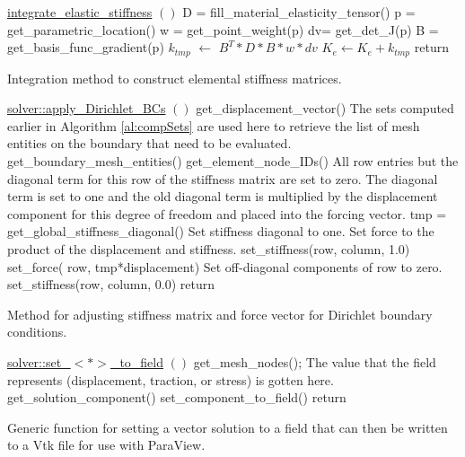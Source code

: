 \documentclass[a4paper, 12pt]{article}
\begin{document}
\vspace{\baselineskip}
\begin{algorithm}
  \underline{integrate\_elastic\_stiffness} $()$
  \BlankLine
  D = fill\_material\_elasticity\_tensor()\;
  {
    p = get\_parametric\_location()\;
    w = get\_point\_weight(p)\;
    dv= get\_det\_J(p)\;
    B = get\_basis\_func\_gradient(p)\;
    $k_{tmp}$ $\leftarrow$ $B^{T}*D*B*w*dv$\;
    $K_e \leftarrow K_e + k_{tmp}$\;
  }
  return\;
  \caption{Integration method to construct elemental stiffness matrices.}
  \label{al:KE_int}
\end{algorithm}

\clearpage
\begin{algorithm}[H]
  \underline{solver::apply\_Dirichlet\_BCs} $()$
  \BlankLine
  {
    get\_displacement\_vector()\;
    \tcc
    {
      The sets computed earlier in Algorithm \ref{al:compSets}
      are used here to
      retrieve the list of mesh entities on the boundary
      that need to be evaluated.
    }
    get\_boundary\_mesh\_entities()\;
    {
      get\_element\_node\_IDs()\;
      {
        \tcc
        {
          All row entries but the diagonal term for this
          row of the stiffness matrix are set to zero. The
          diagonal term is set to one and the old diagonal
          term is multiplied by the displacement component
          for this degree of freedom and placed into the
          forcing vector.
        }
        tmp = get\_global\_stiffness\_diagonal()\;
        {
          {
            \tcc
            {
              Set stiffness diagonal to one. 
              Set force to the product of the displacement
              and stiffness.
            }
            set\_stiffness(row, column, 1.0)\;
            set\_force( row, tmp*displacement)\;
          }
          \Else
          {
            \tcc
            {
              Set off-diagonal components of row to zero.
            }
            set\_stiffness(row, column, 0.0)\; 
          }
        }
      }
    }
  }
  return\;
  \caption{Method for adjusting stiffness matrix and force vector for
            Dirichlet boundary conditions.}
  \label{al:ApplyDBCs}
\end{algorithm}

\vspace{\baselineskip}
\begin{algorithm}[H]
  \underline{solver::set\_$<*>$\_to\_field} $()$
  \BlankLine
  get\_mesh\_nodes();
  {
    {
      \tcc
      {
        The value that the field represents (displacement,
        traction, or stress) is gotten here.
      }
      get\_solution\_component()\;
      set\_component\_to\_field()\;
    }
  }
  return\;
  \caption{Generic function for setting a vector solution to a field
            that can then be written to a Vtk file for use with ParaView.}
  \label{al:set_to_field}
\end{algorithm}
\end{document}
